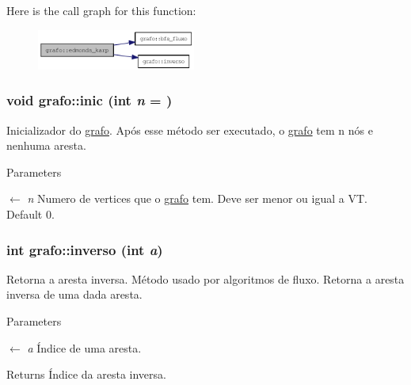 Here is the call graph for this function:\nopagebreak
\begin{figure}[H]
\begin{center}
\leavevmode
\includegraphics[width=148pt]{structgrafo_aca7cabbd616b0a82a367a86d8e2f0fd2_cgraph}
\end{center}
\end{figure}
\hypertarget{structgrafo_aaeb29fff6b2f5df43d6cd809942a0642}{
\subsubsection[{inic}]{\setlength{\rightskip}{0pt plus 5cm}void grafo::inic (int {\em n} = {})}}
\label{structgrafo_aaeb29fff6b2f5df43d6cd809942a0642}


Inicializador do \hyperlink{structgrafo}{grafo}. Após esse método ser executado, o \hyperlink{structgrafo}{grafo} tem n nós e nenhuma aresta.


\begin{DoxyParams}{Parameters}
\item[\mbox{$\leftarrow$} {\em n}]Numero de vertices que o \hyperlink{structgrafo}{grafo} tem. Deve ser menor ou igual a VT. Default 0. \end{DoxyParams}
\hypertarget{structgrafo_a29123b27d787f47c2bd1905594a09903}{
\subsubsection[{inverso}]{\setlength{\rightskip}{0pt plus 5cm}int grafo::inverso (int {\em a})}}
\label{structgrafo_a29123b27d787f47c2bd1905594a09903}


Retorna a aresta inversa. Método usado por algoritmos de fluxo. Retorna a aresta inversa de uma dada aresta.


\begin{DoxyParams}{Parameters}
\item[\mbox{$\leftarrow$} {\em a}]Índice de uma aresta. \end{DoxyParams}
\begin{DoxyReturn}{Returns}
Índice da aresta inversa. 
\end{DoxyReturn}


